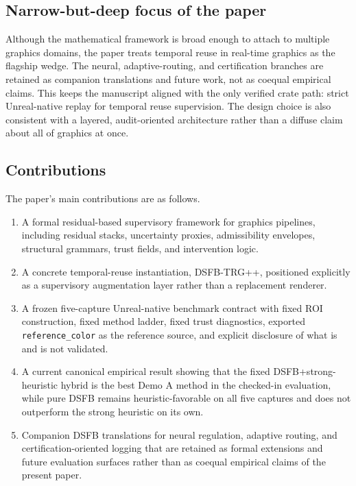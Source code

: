 \documentclass[11pt]{article}
\theoremstyle{definition}
\theoremstyle{plain}
\begin{document}

\subsection{Narrow-but-deep focus of the paper}

Although the mathematical framework is broad enough to attach to multiple graphics domains, the paper treats temporal reuse in real-time graphics as the flagship wedge. The neural, adaptive-routing, and certification branches are retained as companion translations and future work, not as coequal empirical claims. This keeps the manuscript aligned with the only verified crate path: strict Unreal-native replay for temporal reuse supervision. The design choice is also consistent with a layered, audit-oriented architecture rather than a diffuse claim about all of graphics at once. 


\subsection{Contributions}

The paper’s main contributions are as follows.

\begin{enumerate}[leftmargin=1.5em]
    \item A formal residual-based supervisory framework for graphics pipelines, including residual stacks, uncertainty proxies, admissibility envelopes, structural grammars, trust fields, and intervention logic.
    \item A concrete temporal-reuse instantiation, DSFB-TRG++, positioned explicitly as a supervisory augmentation layer rather than a replacement renderer.
    \item A frozen five-capture Unreal-native benchmark contract with fixed ROI construction, fixed method ladder, fixed trust diagnostics, exported \texttt{reference\_color} as the reference source, and explicit disclosure of what is and is not validated.
    \item A current canonical empirical result showing that the fixed DSFB+strong-heuristic hybrid is the best Demo A method in the checked-in evaluation, while pure DSFB remains heuristic-favorable on all five captures and does not outperform the strong heuristic on its own.
    \item Companion DSFB translations for neural regulation, adaptive routing, and certification-oriented logging that are retained as formal extensions and future evaluation surfaces rather than as coequal empirical claims of the present paper.
\end{enumerate}
\end{document}
